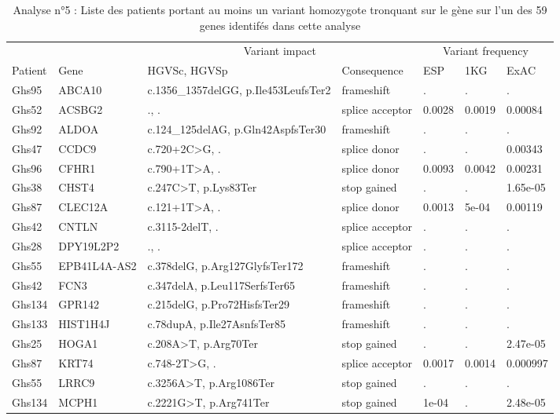 \documentclass[12pt,twoside]{reedthesis}
\theoremstyle{definition}
\theoremstyle{definition}
\theoremstyle{remark}
\begin{document}
  \begin{landscape}
  \begin{longtable}[t]{lllllll}
  \caption{\label{tab:tabgrp4high}Analyse n°5 : Liste des patients portant au moins un variant homozygote tronquant sur le gène sur l'un des 59 genes identifés dans cette analyse}\\
  \toprule
  \multicolumn{1}{c}{ } & \multicolumn{1}{c}{ } & \multicolumn{2}{c}{Variant impact} & \multicolumn{3}{c}{Variant frequency} \\
  \cmidrule(l{2pt}r{2pt}){3-4} \cmidrule(l{2pt}r{2pt}){5-7}
  Patient & Gene & HGVSc, HGVSp & Consequence & ESP & 1KG & ExAC\\
  \midrule
  Ghs95 & ABCA10 & c.1356\_1357delGG, p.Ile453LeufsTer2 & frameshift & . & . & .\\
  Ghs52 & ACSBG2 & ., . & splice acceptor & 0.0028 & 0.0019 & 0.00084\\
  Ghs92 & ALDOA & c.124\_125delAG, p.Gln42AspfsTer30 & frameshift & . & . & .\\
  Ghs47 & CCDC9 & c.720+2C>G, . & splice donor & . & . & 0.00343\\
  Ghs96 & CFHR1 & c.790+1T>A, . & splice donor & 0.0093 & 0.0042 & 0.00231\\
  \addlinespace
  Ghs38 & CHST4 & c.247C>T, p.Lys83Ter & stop gained & . & . & 1.65e-05\\
  Ghs87 & CLEC12A & c.121+1T>A, . & splice donor & 0.0013 & 5e-04 & 0.00119\\
  Ghs42 & CNTLN & c.3115-2delT, . & splice acceptor & . & . & .\\
  Ghs28 & DPY19L2P2 & ., . & splice acceptor & . & . & .\\
  Ghs55 & EPB41L4A-AS2 & c.378delG, p.Arg127GlyfsTer172 & frameshift & . & . & .\\
  \addlinespace
  Ghs42 & FCN3 & c.347delA, p.Leu117SerfsTer65 & frameshift & . & . & .\\
  Ghs134 & GPR142 & c.215delG, p.Pro72HisfsTer29 & frameshift & . & . & .\\
  Ghs133 & HIST1H4J & c.78dupA, p.Ile27AsnfsTer85 & frameshift & . & . & .\\
  Ghs25 & HOGA1 & c.208A>T, p.Arg70Ter & stop gained & . & . & 2.47e-05\\
  Ghs87 & KRT74 & c.748-2T>G, . & splice acceptor & 0.0017 & 0.0014 & 0.000997\\
  \addlinespace
  Ghs55 & LRRC9 & c.3256A>T, p.Arg1086Ter & stop gained & . & . & .\\
  Ghs134 & MCPH1 & c.2221G>T, p.Arg741Ter & stop gained & 1e-04 & . & 2.48e-05\\

\end{longtable}
\end{landscape}
\end{document}
